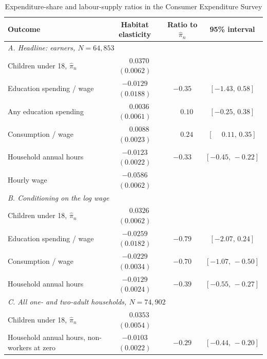 \documentclass[11pt]{article}
\begin{document}
\begin{table}[h!]\centering
\begin{threeparttable}
\caption{Expenditure-share and labour-supply ratios in the Consumer Expenditure Survey}
\label{tab:cex}
\footnotesize\setlength{\tabcolsep}{4pt}
\begin{tabular}{lccc}
\toprule
Outcome & Habitat elasticity & Ratio to $\hat\pi_n$ & 95\% interval\\
\midrule
\multicolumn{4}{l}{\emph{A. Headline: earners, $N=64{,}853$}}\\
Children under 18, $\hat\pi_n$                    & $\phantom{-}0.0370$ $(0.0062)$ & & \\
Education spending / wage                         & $-0.0129$ $(0.0188)$ & $-0.35$ & $[-1.43,\,0.58]$\\
Any education spending                            & $\phantom{-}0.0036$ $(0.0061)$ & $\phantom{-}0.10$ & $[-0.25,\,0.38]$\\
Consumption / wage                                & $\phantom{-}0.0088$ $(0.0023)$ & $\phantom{-}0.24$ & $[\phantom{-}0.11,\,0.35]$\\
Household annual hours                            & $-0.0123$ $(0.0022)$ & $-0.33$ & $[-0.45,\,-0.22]$\\
Hourly wage                                       & $-0.0586$ $(0.0062)$ & & \\
\midrule
\multicolumn{4}{l}{\emph{B. Conditioning on the log wage}}\\
Children under 18, $\hat\pi_n$                    & $\phantom{-}0.0326$ $(0.0062)$ & & \\
Education spending / wage                         & $-0.0259$ $(0.0182)$ & $-0.79$ & $[-2.07,\,0.24]$\\
Consumption / wage                                & $-0.0229$ $(0.0034)$ & $-0.70$ & $[-1.07,\,-0.50]$\\
Household annual hours                            & $-0.0129$ $(0.0024)$ & $-0.39$ & $[-0.55,\,-0.27]$\\
\midrule
\multicolumn{4}{l}{\emph{C. All one- and two-adult households, $N=74{,}902$}}\\
Children under 18, $\hat\pi_n$                    & $\phantom{-}0.0353$ $(0.0054)$ & & \\
Household annual hours, non-workers at zero       & $-0.0103$ $(0.0022)$ & $-0.29$ & $[-0.44,\,-0.20]$\\
\bottomrule
\end{tabular}
\begin{tablenotes}\footnotesize

\end{tablenotes}
\end{threeparttable}
\end{table}
\end{document}
